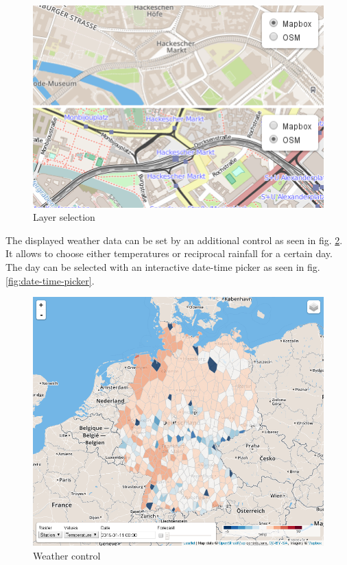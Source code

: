 \documentclass[paper=a4, fontsize=11pt]{article} %
\numberwithin{equation}{section} %
\numberwithin{figure}{section} %
\numberwithin{table}{section} %
\begin{document}
\begin{figure}[htbp]
\includegraphics[width=1\textwidth]{pictures/screenshot-baselayer.png}
\caption{Layer selection}
\label{fig:layer-selection}
\end{figure}

The displayed weather data can be set by an additional control as seen
in fig. \ref{fig:weather-control}.
It allows to choose either temperatures or reciprocal rainfall for a
certain day. The day can be selected with an interactive date-time picker
as seen in fig. \ref{fig:date-time-picker}.

\begin{figure}[htbp]
\includegraphics[width=1\textwidth]{pictures/screenshot-control.png}
\caption{Weather control}
\label{fig:weather-control}
\end{figure}
\end{document}
